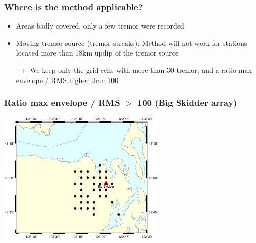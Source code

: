 \documentclass{beamer}
\begin{document}
	\begin{frame}
		\frametitle{Where is the method applicable?}
		\vspace{1em}

		\begin{itemize}
			\item Areas badly covered, only a few tremor were recorded

			\vspace{1em}

			\item Moving tremor source (tremor streaks): Method will not work for stations located more than 18km updip of the tremor source

			\vspace{1em}

			$\rightarrow$ We keep only the grid cells with more than 30 tremor, and a ratio max envelope / RMS higher than 100
		\end{itemize}
	\end{frame}


	\begin{frame}
		\frametitle{Ratio max envelope / RMS $>$ 100 (Big Skidder array)}
		\begin{center}
			\includegraphics[trim={0cm 4cm 0cm 9.5cm}, clip, width=8cm]{BS/grid_location.eps}
		\end{center}
	\end{frame}
\end{document}
